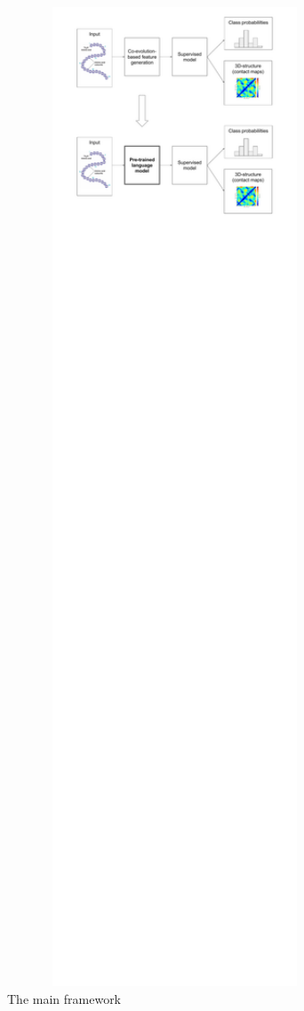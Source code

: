 \documentclass[12pt, twoside]{article}
\begin{document}
\begin{figure}[htp]
    \centering
    \includegraphics[width=10cm]{figures/figure1.pdf}
    \caption{The main framework}
\end{figure}
\end{document}
